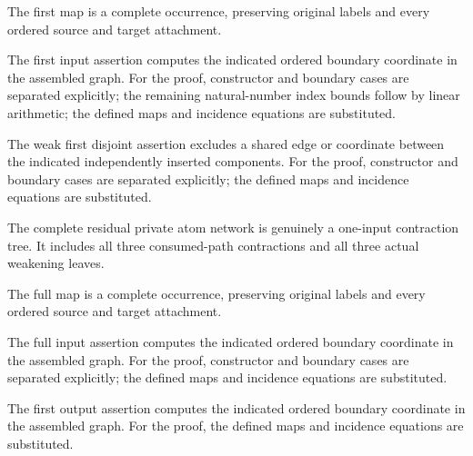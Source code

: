 The first map is a complete occurrence, preserving original labels and every ordered source and target attachment.
\par{}

The first input assertion computes the indicated ordered boundary coordinate in the assembled graph.
For the proof, constructor and boundary cases are separated explicitly; the remaining natural-number index bounds follow by linear arithmetic; the defined maps and incidence equations are substituted.
\par{}

The weak first disjoint assertion excludes a shared edge or coordinate between the indicated independently inserted components.
For the proof, constructor and boundary cases are separated explicitly; the defined maps and incidence equations are substituted.
\par{}

The complete residual private atom network is genuinely a one-input contraction tree. It includes all three consumed-path contractions and all three actual weakening leaves.
\par{}

The full map is a complete occurrence, preserving original labels and every ordered source and target attachment.
\par{}

The full input assertion computes the indicated ordered boundary coordinate in the assembled graph.
For the proof, constructor and boundary cases are separated explicitly; the defined maps and incidence equations are substituted.
\par{}

The first output assertion computes the indicated ordered boundary coordinate in the assembled graph.
For the proof, the defined maps and incidence equations are substituted.
\par{}

